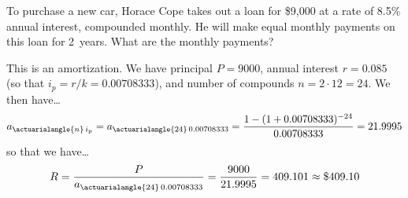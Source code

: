 \documentclass[11pt,letterpaper]{article}
\begin{document}
\newpage



 To purchase a new car, Horace Cope takes out a loan for \$9,000 at a rate of 8.5\% annual interest, compounded monthly. He will make equal monthly payments on this loan for 2~years. What are the monthly payments? \pspace

\sol This is an amortization. We have principal $P= 9000$, annual interest $r= 0.085$ (so that $i_p= r/k= 0.00708333$), and number of compounds $n= 2 \cdot 12= 24$. We then have\dots
	\[
	a_{\actuarialangle{n}\,i_p}= a_{\actuarialangle{24}\,0.00708333}= \dfrac{1 - (1 + 0.00708333)^{-24}}{0.00708333}= 21.9995
	\]
so that we have\dots
	\[
	R= \dfrac{P}{a_{\actuarialangle{24}\,0.00708333}}= \dfrac{9000}{21.9995}= 409.101 \approx \$409.10
	\]
\end{document}
